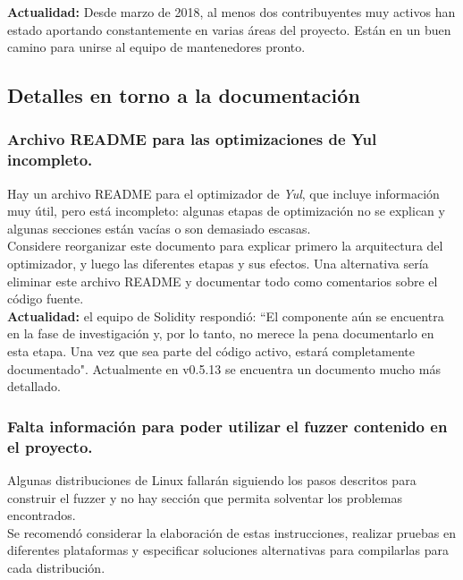 \textbf{Actualidad:} Desde marzo de 2018\cite{GHContributors2}, al menos dos contribuyentes muy activos han estado aportando constantemente en varias áreas del proyecto. Están en un buen camino para unirse al equipo de mantenedores pronto.

\subsection{Detalles en torno a la documentación}

\subsubsection{Archivo README para las optimizaciones de Yul incompleto.}
Hay un archivo README\cite{GHLibjuliaReadme} para el optimizador de \textit{Yul}, que incluye información muy útil, pero está incompleto: algunas etapas de optimización no se explican y algunas secciones están vacías o son demasiado escasas.\\

Considere reorganizar este documento para explicar primero la arquitectura del optimizador, y luego las diferentes etapas y sus efectos. Una alternativa sería eliminar este archivo README y documentar todo como comentarios sobre el código fuente.\\

\textbf{Actualidad:} el equipo de Solidity respondió: “El componente aún se encuentra en la fase de investigación y, por lo tanto, no merece la pena documentarlo en esta etapa. Una vez que sea parte del código activo, estará completamente documentado". Actualmente en v0.5.13 se encuentra un documento\cite{GHYulReadme} mucho más detallado.

\subsubsection{Falta información para poder utilizar el fuzzer contenido en el proyecto.}

Algunas distribuciones de Linux fallarán siguiendo los pasos descritos para construir el fuzzer y no hay sección que permita solventar los problemas encontrados.\\

Se recomendó considerar la elaboración de estas instrucciones, realizar pruebas en diferentes plataformas y especificar soluciones alternativas para compilarlas para cada distribución.\\

